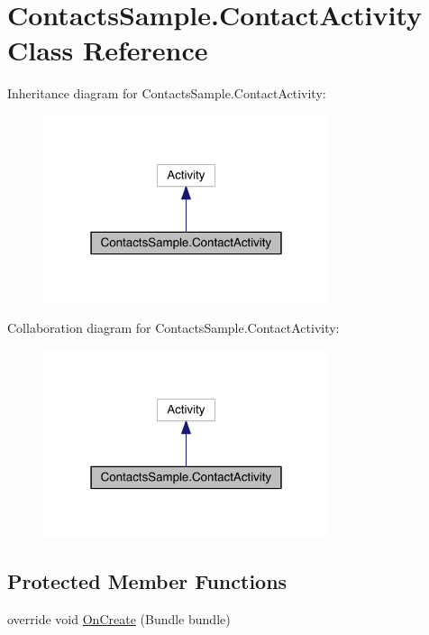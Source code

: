 \hypertarget{class_contacts_sample_1_1_contact_activity}{\section{Contacts\+Sample.\+Contact\+Activity Class Reference}
\label{class_contacts_sample_1_1_contact_activity}
}


Inheritance diagram for Contacts\+Sample.\+Contact\+Activity\+:
\nopagebreak
\begin{figure}[H]
\begin{center}
\leavevmode
\includegraphics[width=238pt]{class_contacts_sample_1_1_contact_activity__inherit__graph}
\end{center}
\end{figure}


Collaboration diagram for Contacts\+Sample.\+Contact\+Activity\+:
\nopagebreak
\begin{figure}[H]
\begin{center}
\leavevmode
\includegraphics[width=238pt]{class_contacts_sample_1_1_contact_activity__coll__graph}
\end{center}
\end{figure}
\subsection*{Protected Member Functions}
\begin{DoxyCompactItemize}
\item 
override void \hyperlink{class_contacts_sample_1_1_contact_activity_a41d9105841d85df12acefd881ab7cd48}{On\+Create} (Bundle bundle)
\end{DoxyCompactItemize}


